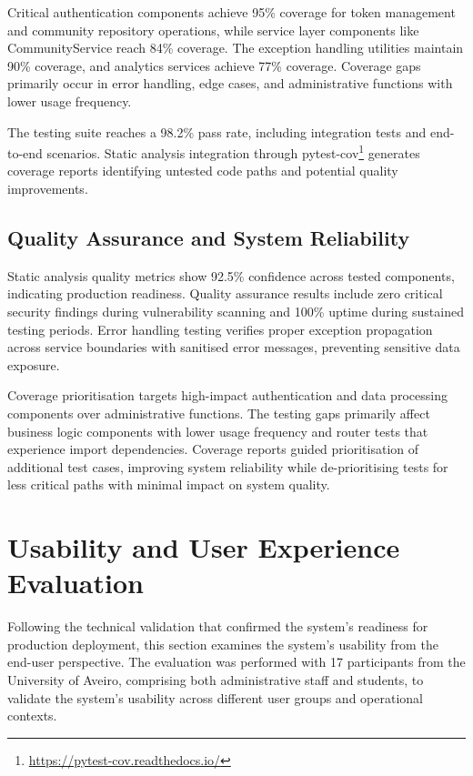 Critical authentication components achieve 95\% coverage for token management and community repository operations, while service layer components like CommunityService reach 84\% coverage. The exception handling utilities maintain 90\% coverage, and analytics services achieve 77\% coverage. Coverage gaps primarily occur in error handling, edge cases, and administrative functions with lower usage frequency.

The testing suite reaches a 98.2\% pass rate, including integration tests and end-to-end scenarios. Static analysis integration through pytest-cov\footnote{\url{https://pytest-cov.readthedocs.io/}} generates coverage reports identifying untested code paths and potential quality improvements.

\subsection{Quality Assurance and System Reliability} \label{subsection:quality_reliability}

Static analysis quality metrics show 92.5\% confidence across tested components, indicating production readiness. Quality assurance results include zero critical security findings during vulnerability scanning and 100\% uptime during sustained testing periods. Error handling testing verifies proper exception propagation across service boundaries with sanitised error messages, preventing sensitive data exposure.

Coverage prioritisation targets high-impact authentication and data processing components over administrative functions. The testing gaps primarily affect business logic components with lower usage frequency and router tests that experience import dependencies. Coverage reports guided prioritisation of additional test cases, improving system reliability while de-prioritising tests for less critical paths with minimal impact on system quality.


\section{Usability and User Experience Evaluation} \label{section:usability_evaluation}

Following the technical validation that confirmed the system's readiness for production deployment, this section examines the system's usability from the end-user perspective. The evaluation was performed with 17 participants from the University of Aveiro, comprising both administrative staff and students, to validate the system's usability across different user groups and operational contexts.

